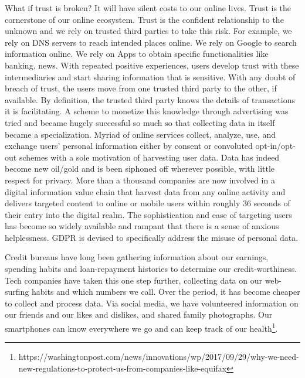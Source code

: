 \documentclass[runningheads]{llncs}
\begin{document}
\noindent What if trust is broken? It will have silent costs to our
online lives. Trust is the cornerstone of our online ecosystem. Trust
is the confident relationship to the unknown and we rely on trusted
third parties to take this risk. For example, we rely on DNS servers
to reach intended places online. We rely on Google to search
information online. We rely on Apps to obtain specific functionalities
like banking, news. With repeated positive experiences, users develop
trust with these intermediaries and start sharing information that is
sensitive. With any doubt of breach of trust, the users move from one
trusted third party to the other, if available. By definition, the
trusted third party knows the details of transactions it is
facilitating. A scheme to monetize this knowledge through advertising
was tried and became hugely successful so much so that collecting data
in itself became a specialization. Myriad of online services collect,
analyze, use, and exchange users' personal information either by
consent or convoluted opt-in/opt-out schemes with a sole motivation of
harvesting user data. Data has indeed become new oil/gold and is been
siphoned off wherever possible, with little respect for privacy. More
than a thousand companies are now involved in a digital information
value chain that harvest data from any online activity and delivers
targeted content to online or mobile users within roughly 36 seconds
of their entry into the digital realm. The sophistication and ease of
targeting users has become so widely available and rampant that there
is a sense of anxious helplessness. GDPR is devised to specifically
address the misuse of personal data.

Credit bureaus have long been gathering information about our
earnings, spending habits and loan-repayment histories to determine
our credit-worthiness. Tech companies have taken this one step
further, collecting data on our web-surfing habits and which numbers
we call. Over the period, it has become cheaper to collect and process
data. Via social media, we have volunteered information on our friends
and our likes and dislikes, and shared family photographs. Our
smartphones can know everywhere we go and can keep track of our
health\footnote{https://washingtonpost.com/news/innovations/wp/2017/09/29/why-we-need-new-regulations-to-protect-us-from-companies-like-equifax}.


\end{document}
